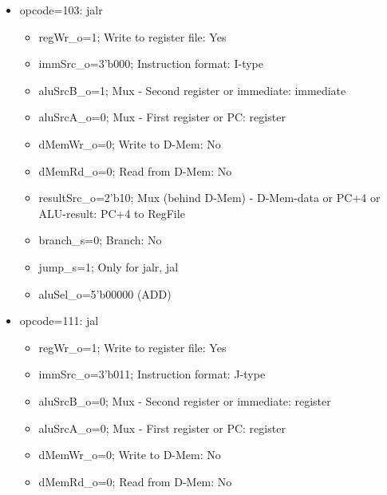 \begin{itemize}
\begin{itemize}
\begin{itemize}
\begin{itemize}
        \item aluSrcA\_o=0; Mux - First register or PC: register
        \item dMemWr\_o=0; Write to D-Mem: No
        \item dMemRd\_o=0; Read from D-Mem: No
        \item resultSrc\_o=2'b00; Mux (behind D-Mem) - D-Mem-data or PC+4 or ALU-result: ALU-result to RegFile
        \item branch\_s=1; Branch: Yes
        \item jump\_s=0; Only for jalr, jal
        \item aluSel\_o=various
      \end{itemize}
      \item opcode=103: jalr
      \begin{itemize}
        \item regWr\_o=1; Write to register file: Yes
        \item immSrc\_o=3'b000; Instruction format: I-type
        \item aluSrcB\_o=1; Mux - Second register or immediate: immediate
        \item aluSrcA\_o=0; Mux - First register or PC: register
        \item dMemWr\_o=0; Write to D-Mem: No
        \item dMemRd\_o=0; Read from D-Mem: No
        \item resultSrc\_o=2'b10; Mux (behind D-Mem) - D-Mem-data or PC+4 or ALU-result: PC+4 to RegFile
        \item branch\_s=0; Branch: No
        \item jump\_s=1; Only for jalr, jal
        \item aluSel\_o=5'b00000 (ADD)
      \end{itemize}
      \item opcode=111: jal
      \begin{itemize}
        \item regWr\_o=1; Write to register file: Yes
        \item immSrc\_o=3'b011; Instruction format: J-type
        \item aluSrcB\_o=0; Mux - Second register or immediate: register
        \item aluSrcA\_o=0; Mux - First register or PC: register
        \item dMemWr\_o=0; Write to D-Mem: No
        \item dMemRd\_o=0; Read from D-Mem: No

\end{itemize}
\end{itemize}
\end{itemize}
\end{itemize}
